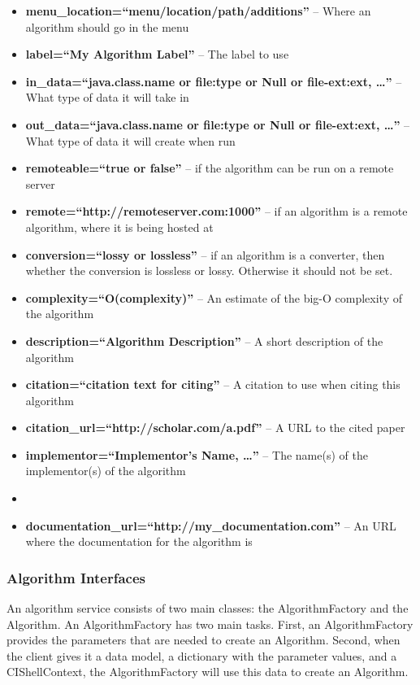 \documentclass[a4]{article}
\begin{document}
\begin{itemize}
\item {\bf menu\_location=``menu/location/path/additions''} -- Where an algorithm
should go in the menu
\item {\bf label=``My Algorithm Label''} -- The label to use
\item {\bf in\_data=``java.class.name or file:type or Null or file-ext:ext,
\ldots''} -- What type of data it will take in
\item {\bf out\_data=``java.class.name or file:type or Null or file-ext:ext,
\ldots''} -- What type of data it will create when run
\item {\bf remoteable=``true or false''} -- if the algorithm can be run on a
remote server
\item {\bf remote=``http://remoteserver.com:1000''} -- if an algorithm is a remote algorithm,
where it is being hosted at
\item {\bf conversion=``lossy or lossless''} -- if an algorithm is a converter,
then whether the conversion is lossless or lossy. Otherwise it should not be set.
\item {\bf complexity=``O(complexity)''} -- An estimate of the big-O complexity
of the algorithm
\item {\bf description=``Algorithm Description''} -- A short description of the
algorithm
\item {\bf citation=``citation text for citing''} -- A citation to use when
citing this algorithm
\item {\bf citation\_url=``http://scholar.com/a.pdf''} -- A URL to the cited paper
\item {\bf implementor=``Implementor's Name, \ldots''} -- The name(s) of the implementor(s)
of the algorithm\item 
\item {\bf documentation\_url=``http://my\_documentation.com''} -- An URL where
the documentation for the algorithm is
\end{itemize}

\subsubsection{Algorithm Interfaces}

An algorithm service consists of two main classes: the AlgorithmFactory and the 
Algorithm. An AlgorithmFactory has two main tasks. First, an AlgorithmFactory 
provides the parameters that are needed to create an Algorithm. Second, when 
the client gives it a data model, a dictionary with the parameter values, and a 
CIShellContext, the AlgorithmFactory will use this data to create an Algorithm.
\end{document}
